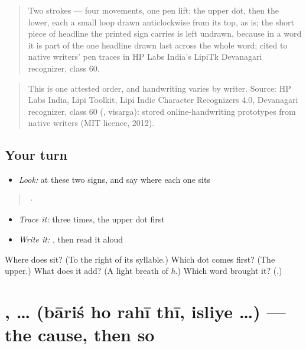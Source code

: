 \begin{quote}
Two strokes — four movements, one pen lift; the upper dot, then the lower, each a small loop drawn anticlockwise from its top, as  is; the short piece of headline the printed sign carries is left undrawn, because in a word it is part of the one headline drawn last across the whole word; cited to native writers' pen traces in HP Labs India's LipiTk Devanagari recognizer, class 60.
\end{quote}

\begin{quote}
This is one attested order, and handwriting varies by writer. Source: HP Labs India, Lipi Toolkit, Lipi Indic Character Recognizers 4.0, Devanagari recognizer, class 60 (, visarga): stored online-handwriting prototypes from native writers (MIT licence, 2012).
\end{quote}

\subsection*{Your turn}
\begin{itemize}
\raggedright
  \item \emph{Look:} at these two signs, and say where each one sits
\end{itemize}

\begin{quote}
  ·  
\end{quote}

\begin{itemize}
\raggedright
  \item \emph{Trace it:}  three times, the upper dot first
  \item \emph{Write it:} \textbf{}, then read it aloud
\end{itemize}

\begin{tcolorbox}[breakable,colback=teal!4,colframe=teal!35!black,title={Before you move on}]
Where does \textbf{} sit? (To the right of its syllable.) Which dot comes first? (The upper.) What does it add? (A light breath of \emph{h}.) Which word brought it? (\textbf{}.)
\end{tcolorbox}
\section[\texorpdfstring{\hi{बारिश} \hi{हो} \hi{रही} \hi{थी} … (bāriś ho rahī …)}{बारिश हो रही थी … (bāriś ho rahī …)}]{   ,  … (bāriś ho rahī thī, isliye …) — the cause, then so}

